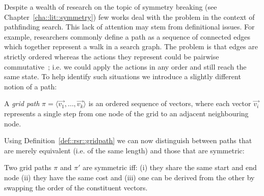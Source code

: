 Despite a wealth of research on the topic of symmetry breaking (see 
Chapter~\ref{cha::lit::symmetry})
few works deal with the problem in the context of pathfinding search. 
This lack of attention may stem from definitional issues. For example, researchers commonly
define a path as a sequence of connected edges which together represent a walk in 
a search graph.
The problem is that edges are strictly ordered whereas the actions they
represent could be pairwise commutative~\citep{haslum00}; i.e. we could
apply the actions in any order and still reach the same state.
To help identify such situations we introduce a slightly different notion of a
path:

\begin{definition}
\label{def::rsr::gridpath}
A \emph{grid path} $\pi = \langle \vec{v_1}, \ldots, \vec{v_k} \rangle$ is an ordered sequence 
of vectors, where each vector $\vec{v_i}$ represents a single step from one node of 
the grid to an adjacent neighbouring node. 
\end{definition}

Using Definition~\ref{def::rsr::gridpath} we can now distinguish between paths that are 
merely equivalent (i.e. of the same length) and those that are symmetric:

\begin{definition}
Two grid paths $\pi$ and $\pi'$ are symmetric iff: (i) they share the same 
start and end node (ii) they have the same cost and (iii) one can be derived from 
the other by swapping the order of the constituent vectors.
\end{definition}


